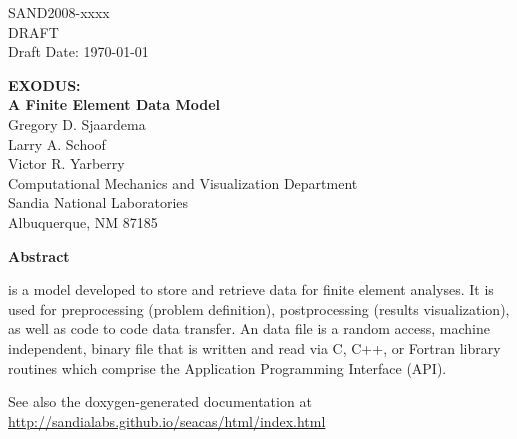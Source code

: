 \begin{titlepage}
\begin{center}
SAND2008-xxxx\\
DRAFT\\
Draft Date: \today\\
\end{center}

\vspace{1.0in}

\begin{center}
{\Huge\bf EXODUS:\\ A Finite Element Data Model\\}
\vspace{1.0in}
{\large Gregory D. Sjaardema\\
	Larry A. Schoof\\
	Victor R. Yarberry\\
	Computational Mechanics and Visualization Department\\
	Sandia National Laboratories\\
	Albuquerque, NM 87185}
\end{center}
\vspace{1.0in}
\begin{center}
\large\bf Abstract
\end{center}

\exo{} is a model developed to store and retrieve data for finite
element analyses. It is used for preprocessing (problem definition),
postprocessing (results visualization), as well as code to code data
transfer. An \exo{} data file is a random access, machine independent,
binary file that is written and read via C, C++, or Fortran library
routines which comprise the Application Programming Interface (API).

See also the doxygen-generated documentation at \url{http://sandialabs.github.io/seacas/html/index.html}

\end{titlepage}
